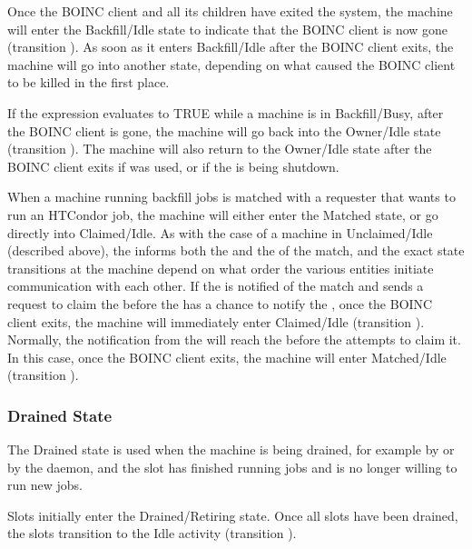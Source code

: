 Once the BOINC client and all its children have exited the system, the
machine will enter the Backfill/Idle state to indicate that the BOINC
client is now gone (transition ).
As soon as it enters Backfill/Idle after the BOINC client exits, the
machine will go into another state, depending on what caused the BOINC
client to be killed in the first place.

If the  expression evaluates to TRUE while a
machine is in Backfill/Busy, after the BOINC client is gone, the
machine will go back into the Owner/Idle state (transition
).
The machine will also return to the Owner/Idle state after the BOINC
client exits if  was used, or if the  is
being shutdown.

When a machine running backfill jobs is matched with a requester that
wants to run an HTCondor job, the machine will either enter the Matched
state, or go directly into Claimed/Idle.
As with the case of a machine in Unclaimed/Idle (described above), the
 informs both the  and the
 of the match, and the exact state transitions at the
machine depend on what order the various entities initiate
communication with each other.
If the  is notified of the match and sends a request to
claim the  before the  has a chance
to notify the , once the BOINC client exits, the
machine will immediately enter Claimed/Idle (transition ).
Normally, the notification from the  will reach the
 before the  attempts to claim it.
In this case, once the BOINC client exits, the machine will enter
Matched/Idle (transition ).

\subsubsection{\label{sec:Drained-State}Drained State}

The Drained state is used when the machine is being drained,
for example by  or by the  daemon,
and the slot has finished running
jobs and is no longer willing to run new jobs.

Slots initially enter the Drained/Retiring state.  Once all slots have
been drained, the slots transition to the Idle activity (transition
).

